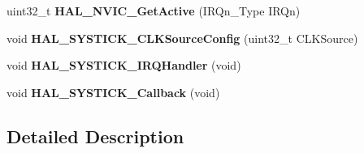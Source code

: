 \begin{DoxyCompactItemize}
\item 
\mbox{\label{group___c_o_r_t_e_x___exported___functions___group2_gad3f7598e54fb3d74eaf9abedef704c57}} 
uint32\+\_\+t {\bfseries H\+A\+L\+\_\+\+N\+V\+I\+C\+\_\+\+Get\+Active} (I\+R\+Qn\+\_\+\+Type I\+R\+Qn)
\item 
\mbox{\label{group___c_o_r_t_e_x___exported___functions___group2_ga3284dc8428996f5b6aa6b3b99e643788}} 
void {\bfseries H\+A\+L\+\_\+\+S\+Y\+S\+T\+I\+C\+K\+\_\+\+C\+L\+K\+Source\+Config} (uint32\+\_\+t C\+L\+K\+Source)
\item 
\mbox{\label{group___c_o_r_t_e_x___exported___functions___group2_ga5b66b62383261c1e0acef98d344aa4c1}} 
void {\bfseries H\+A\+L\+\_\+\+S\+Y\+S\+T\+I\+C\+K\+\_\+\+I\+R\+Q\+Handler} (void)
\item 
\mbox{\label{group___c_o_r_t_e_x___exported___functions___group2_ga5033855e81ba2071231b60599a3ce9a1}} 
void {\bfseries H\+A\+L\+\_\+\+S\+Y\+S\+T\+I\+C\+K\+\_\+\+Callback} (void)
\end{DoxyCompactItemize}


\subsection{Detailed Description}
